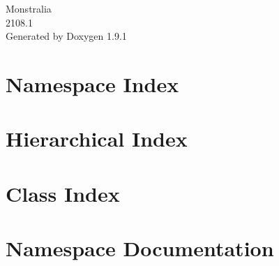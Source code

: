 \let\mypdfximage\pdfximage\def\pdfximage{\immediate\mypdfximage}\documentclass[twoside]{book}
\newcommand{\+}{\discretionary{\mbox{\scriptsize$\hookleftarrow$}}{}{}}
\newcommand{\clearemptydoublepage}{%
  \newpage{\pagestyle{empty}\cleardoublepage}%
}
\begin{document}
\raggedbottom

\hypersetup{pageanchor=false,
             bookmarksnumbered=true,
             pdfencoding=unicode
            }
\begin{titlepage}
\vspace*{7cm}
\begin{center}%
{\Large Monstralia \\[1ex]\large 2108.\+1 }\\
\vspace*{1cm}
{\large Generated by Doxygen 1.9.1}\\
\end{center}
\end{titlepage}
\clearemptydoublepage
{}
\tableofcontents
\clearemptydoublepage
{}
\hypersetup{pageanchor=true}

\chapter{Namespace Index}

\chapter{Hierarchical Index}

\chapter{Class Index}

\chapter{Namespace Documentation}












\end{document}
